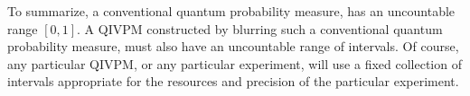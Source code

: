 \documentclass[english,reprint, aps, prl,superscriptaddress, showpacs,
showkeys, longbibliography, amsmath, amssymb, floatfix]{revtex4-1}
\theoremstyle{plain}
\theoremstyle{definition}
\newcommand{\imposs}{{\text{\wesa{impossible}}}}
\newcommand{\necess}{{\text{\wesa{certain}}}}
\newcommand{\proj}[1]{\op{#1}{#1}}
\newcommand{\gerardo}[1]{\fbox{\begin{minipage}{0.9\linewidth}\color{OliveGreen}{Gerardo says: #1}\end{minipage}}}
\newcommand{\ultramodular}{\mathcal{M}}
\begin{document}
To summarize, a conventional quantum probability measure, has an
uncountable range $[0,1]$. A QIVPM constructed by blurring such a
conventional quantum probability measure, must also have an uncountable
range of intervals. Of course, any particular QIVPM, or any particular
experiment, will use a fixed collection of intervals appropriate for
the resources and precision of the particular experiment. 
\gerardo{We need to explain physically what it means?}
\end{document}

